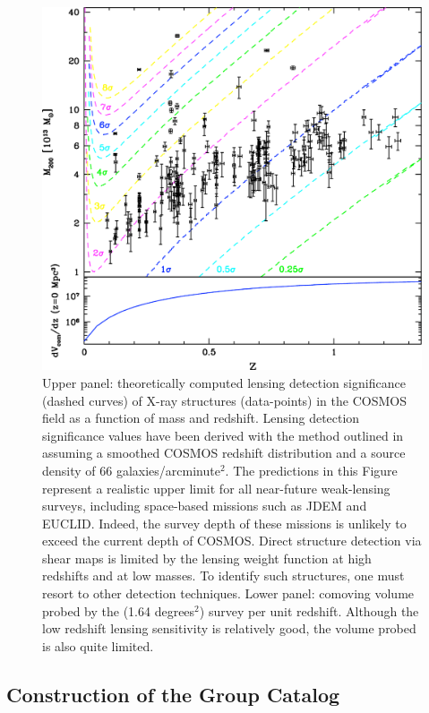 \documentclass[12pt]{emulateapj}
\begin{document}
\begin{figure}[htb]
\centerline{\includegraphics[scale=0.6]{figure1.pdf}}
\caption{Upper panel: theoretically computed lensing detection
  significance (dashed curves) of X-ray structures (data-points) in
  the COSMOS field as a function of mass and redshift. Lensing
  detection significance values have been derived with the method
  outlined in \protect\citet{Hamana:2004} assuming a smoothed COSMOS
  redshift distribution and a source density of 66
  galaxies/arcminute$^2$. The predictions in this Figure represent a
  realistic upper limit for all near-future weak-lensing surveys,
  including space-based missions such as JDEM and EUCLID. Indeed, the
  survey depth of these missions is unlikely to exceed the current
  depth of COSMOS. Direct structure detection via shear maps is
  limited by the lensing weight function at high redshifts and at low
  masses. To identify such structures, one must resort to other
  detection techniques. Lower panel: comoving volume probed by the
  (1.64 degrees$^2$) survey per unit redshift. Although the low
  redshift lensing sensitivity is relatively good, the volume probed
  is also quite limited.}
\label{james_plot}
\end{figure}

\subsection{Construction of the Group Catalog}
 
\end{document}
